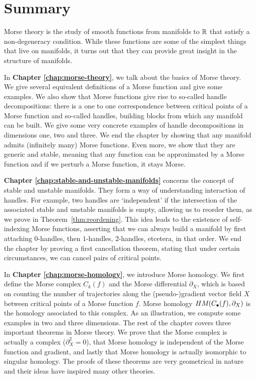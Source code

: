 \chapter*{Summary}
\label{ch:summary}

Morse theory is the study of smooth functions from manifolds to $\mathbb{R}$ that satisfy a non-degeneracy condition. While these functions are some of the simplest things that live on manifolds, it turns out that they can provide great insight in the structure of manifolds.

\bigskip
In \textbf{Chapter \ref{chap:morse-theory}}, we talk about the basics of Morse theory.
We give several equivalent definitions of a Morse function and give some examples.
We also show that Morse functions give rise to so-called handle decompositions: there is a one to one correspondence between critical points of a Morse function and so-called handles, building blocks from which any manifold can be built.
We give some very concrete examples of handle decompositions in dimensions one, two and three.
We end the chapter by showing that any manifold admits (infinitely many) Morse functions.
Even more, we show that they are generic and stable, meaning that any function can be approximated by a Morse function and if we perturb a Morse function, it stays Morse.

\bigskip

\textbf{Chapter \ref{chap:stable-and-unstable-manifolds}} concerns the concept of stable and unstable manifolds.
They form a way of understanding interaction of handles.
For example, two handles are `independent' if the intersection of the associated stable and unstable manifolds is empty, allowing us to reorder them, as we prove in Theorem~\ref{thm:reordening}.
This idea leads to the existence of self-indexing Morse functions, asserting that we can always build a manifold by first attaching $0$-handles, then $1$-handles, $2$-handles, etcetera, in that order.
We end the chapter by proving a first cancellation theorem, stating that under certain circumstances, we can cancel pairs of critical points.

\bigskip
In \textbf{Chapter \ref{chap:morse-homology}}, we introduce Morse homology.
We first define the Morse complex $C_k(f)$ and the Morse differential $\partial_X$, which is based on counting the number of trajectories along the (pseudo-)gradient vector field $X$ between critical points of a Morse function $f$.
Morse homology $HM_{}(C_\bullet(f), \partial_X)$ is the homology associated to this complex.
As an illustration, we compute some examples in two and three dimensions.
The rest of the chapter covers three important theorems in Morse theory.
We prove that the Morse complex is actually a complex ($\partial_X^2 = 0$), that Morse homology is independent of the Morse function and gradient, and lastly that Morse homology is actually isomorphic to singular homology.
The proofs of these theorems are very geometrical in nature and their ideas have inspired many other theories.

